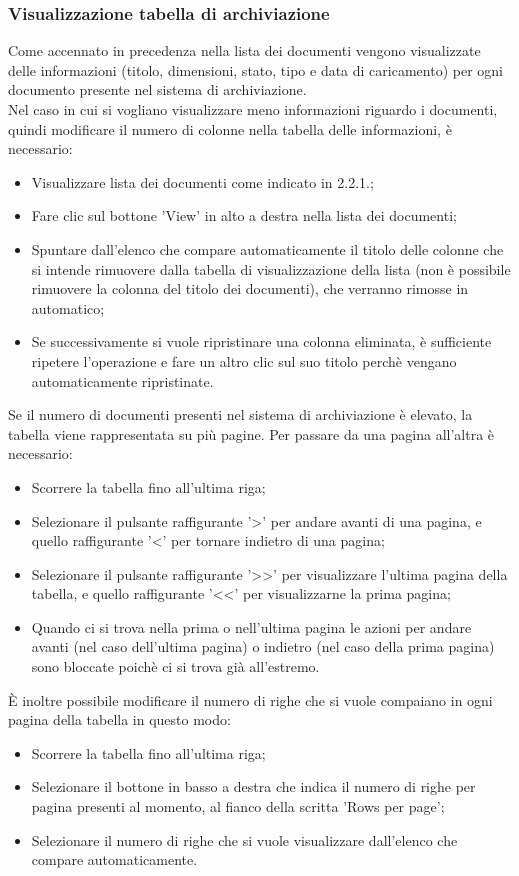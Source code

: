 \documentclass[10pt, a4paper]{article}
\begin{document}
\subsubsection{Visualizzazione tabella di archiviazione}
Come accennato in precedenza nella lista dei documenti vengono visualizzate delle informazioni (titolo, dimensioni, stato, tipo e data di caricamento) per ogni documento presente nel sistema di archiviazione.\\ Nel caso in cui si vogliano visualizzare meno informazioni riguardo i documenti, quindi modificare il numero di colonne nella tabella delle informazioni, è necessario:
\begin{itemize}
    \item Visualizzare lista dei documenti come indicato in 2.2.1.;
    \item Fare clic sul bottone 'View' in alto a destra nella lista dei documenti;
    \item Spuntare dall'elenco che compare automaticamente il titolo delle colonne che si intende rimuovere dalla tabella di visualizzazione della lista (non è possibile rimuovere la colonna del titolo dei documenti), che verranno rimosse in automatico;
    \item Se successivamente si vuole ripristinare una colonna eliminata, è sufficiente ripetere l'operazione e fare un altro clic sul suo titolo perchè vengano automaticamente ripristinate.
\end{itemize}
Se il numero di documenti presenti nel sistema di archiviazione è elevato, la tabella viene rappresentata su più pagine. Per passare da una pagina all'altra è necessario:
\begin{itemize}
    \item Scorrere la tabella fino all'ultima riga;
    \item Selezionare il pulsante raffigurante '>' per andare avanti di una pagina, e quello raffigurante '<' per tornare indietro di una pagina;
    \item Selezionare il pulsante raffigurante '>>' per visualizzare l'ultima pagina della tabella, e quello raffigurante '<<' per visualizzarne la prima pagina;
    \item Quando ci si trova nella prima o nell'ultima pagina le azioni per andare avanti (nel caso dell'ultima pagina) o indietro (nel caso della prima pagina) sono bloccate poichè ci si trova già all'estremo.
\end{itemize}
È inoltre possibile modificare il numero di righe che si vuole compaiano in ogni pagina della tabella in questo modo:
\begin{itemize}
    \item Scorrere la tabella fino all'ultima riga;
    \item Selezionare il bottone in basso a destra che indica il numero di righe per pagina presenti al momento, al fianco della scritta 'Rows per page';
    \item Selezionare il numero di righe che si vuole visualizzare dall'elenco che compare automaticamente.
\end{itemize}
\end{document}
